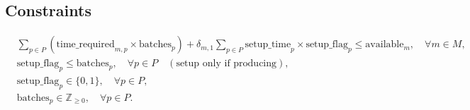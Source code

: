 \documentclass{article}
\begin{document}
\subsection*{Constraints}
\begin{align*}
& \sum_{p \in P} \left( \text{time\_required}_{m,p} \times \text{batches}_{p} \right) + \delta_{m,1} \sum_{p \in P} \text{setup\_time}_{p} \times \text{setup\_flag}_{p} \leq \text{available}_{m}, \quad \forall m \in M, \\
& \text{setup\_flag}_{p} \leq \text{batches}_{p}, \quad \forall p \in P \quad (\text{setup only if producing}), \\
& \text{setup\_flag}_{p} \in \{0, 1\}, \quad \forall p \in P, \\
& \text{batches}_{p} \in \mathbb{Z}_{\geq 0}, \quad \forall p \in P.
\end{align*}
\end{document}
